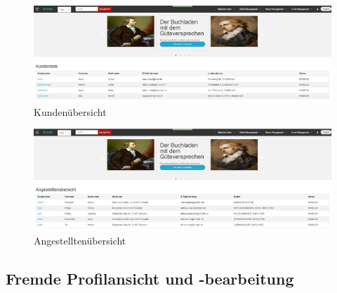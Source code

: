 \documentclass[a4paper]{article}
\begin{document}
\begin{figure}[ht]
\centering
\includegraphics[width=1.0\textwidth]{Kundenliste.jpg}
\caption{Kundenübersicht}
\end{figure}
\smallskip

\begin{figure}[ht]
\centering
\includegraphics[width=1.0\textwidth]{Angestelltenliste.jpg}
\caption{Angestelltenübersicht}
\end{figure}
\smallskip

\FloatBarrier

\subsection{Fremde Profilansicht und -bearbeitung}
\end{document}
